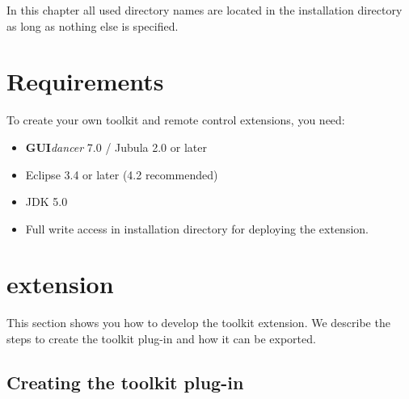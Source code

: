 In this chapter all used directory names are located in the
installation directory  as long as nothing else is specified.

\section{Requirements}
To create your own \ite{} toolkit and remote control extensions, you need:
\begin{itemize}
\item \textbf{GUI}\emph{dancer} 7.0 / Jubula 2.0 or later
\item Eclipse 3.4 or later (4.2 recommended)
\item JDK 5.0
\item Full write access in installation directory for deploying the
extension.
\end{itemize}

\section{\ite{} extension}
\label{iteExtension}

This section shows you how to develop the \ite{} toolkit extension. We describe the
steps to create the toolkit plug-in and how it can be exported.

\subsection{Creating the toolkit plug-in}

